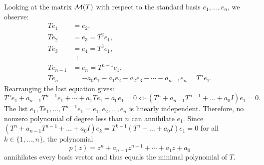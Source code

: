 \begin{xrcs}
  \begin{xsol}
    Looking at the matrix $\mathcal{M}(T)$ with respect to the standard basis $e_1, \dots, e_n$, we observe:
    \begin{equation}
      \begin{aligned}
        T e_1 &= e_2, \\
        T e_2 &= e_3 = T^2 e_1, \\
        T e_3 &= e_4 = T^3 e_1, \\
              & \; \; \vdots \\
        T e_{n-1} &= e_n = T^{n-1} e_1, \\
        T e_n &= -a_0 e_1 - a_1 e_2 - a_2 e_3 - \cdots - a_{n-1} e_n = T^n e_1.
      \end{aligned}
    \end{equation}
    Rearranging the last equation gives:
    \begin{equation}
      T^n e_1 + a_{n-1} T^{n-1} e_1 + \cdots + a_1 T e_1 + a_0 e_1 = 0 \iff (T^n + a_{n-1} T^{n-1} + \dots + a_0 I) e_1 = 0.
    \end{equation}
    The list $e_1, T e_1, \dots, T^{n-1} e_1 = e_1, e_2, \dots, e_n$ is linearly independent.
    Therefore, no nonzero polynomial of degree less than $n$ can annihilate $e_1$.
    Since $(T^n + a_{n-1}T^{n-1} + \dots + a_0 I) e_k = T^{k-1}(T^n + \dots + a_0 I)e_1 = 0$ for all $k \in \{1, \dots, n\}$, the polynomial
    \begin{equation}
      p(z) = z^n + a_{n-1} z^{n-1} + \cdots + a_1 z + a_0
    \end{equation}
    annihilates every basis vector and thus equals the minimal polynomial of $T$.
  \end{xsol}
\end{xrcs}

